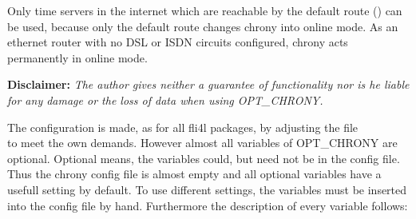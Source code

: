 Only time servers in the internet which are reachable by the default route ()
can be used, because only the default route changes chrony into online mode.
As an ethernet router with no DSL or ISDN circuits configured, chrony acts permanently
in online mode.

\textbf{Disclaimer: }\emph{The author gives neither a guarantee of functionality nor is he liable 
for any damage or the loss of data when using OPT\_\-CHRONY.}



The configuration is made, as for all fli4l packages, by adjusting the file\\
 to meet the own demands.
However almost all variables of OPT\_\-CHRONY are optional. Optional means, the
variables could, but need not be in the config file.
Thus the chrony config file is almost empty and all optional 
variables have a usefull setting by default.
To use different settings, the variables must be inserted into the config file 
by hand. Furthermore the description of every variable follows:


